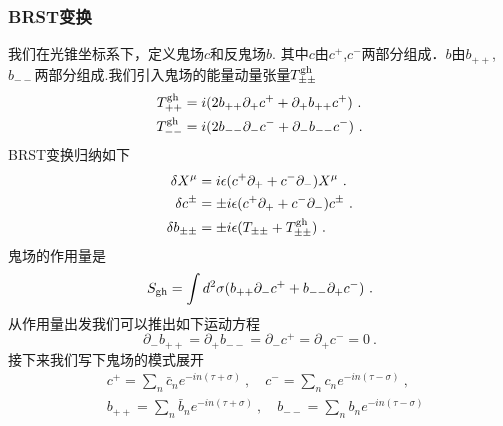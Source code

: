 \subsubsection{BRST变换}
我们在光锥坐标系下，定义鬼场$c$和反鬼场$b$. 其中$c$由$c^+$,$c^-$两部分组成．$b$由$b_{++}$,$b_{--}$两部分组成.我们引入鬼场的能量动量张量$T^{\rm gh}_{\pm\pm}$
\begin{equation}
\begin{aligned}
T^{\rm gh}_{++} &  = i (2 b_{++}\partial_+ c^+ +\partial_+ b_{++}c^+)~. \\
T^{\rm gh}_{--} &  = i (2 b_{--}\partial_- c^- +\partial_- b_{--}c^-)~.
\end{aligned}
\end{equation}
BRST变换归纳如下
\begin{equation}
\begin{aligned}
\delta X^\mu & = i \epsilon (c^+\partial_+ + c^- \partial_- ) X^\mu~. \\
\delta c^{\pm} & = \pm i \epsilon (c^+\partial_++c^-\partial_-) c^{\pm} ~. \\
\delta b_{\pm\pm} & = \pm i \epsilon (T_{\pm\pm} +T^{\rm gh}_{\pm\pm})~. 
\end{aligned}
\end{equation}
鬼场的作用量是
\begin{equation}
S_{\rm gh} = \int d^2\sigma (b_{++} \partial_- c^+ + b_{--} \partial_+ c^- ) ~.
\end{equation}
从作用量出发我们可以推出如下运动方程
\begin{equation}
\partial_- b_{++} = \partial_+ b_{--} = \partial_- c^+  = \partial_+ c^- = 0~.
\end{equation}
接下来我们写下鬼场的模式展开
\begin{equation}
\begin{aligned}
& c^+ = \sum_n \bar c_n e^{-i n (\tau+\sigma)} ~, \quad c^- = \sum_n c_n e^{-in(\tau-\sigma)} ~, \\
& b_{++} = \sum_n \bar b_n e^{-i n (\tau+\sigma)}~, \quad b_{--} = \sum_n b_n e^{-in(\tau-\sigma)}
\end{aligned}
\end{equation}
























